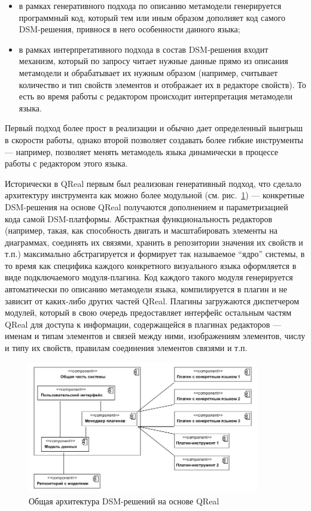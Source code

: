 \documentclass[a4]{article}
\begin{document}
\begin{itemize}
 \item в рамках генеративного подхода по описанию метамодели генерируется программный код, который тем или иным образом дополняет код самого DSM-решения, привнося в него особенности данного языка;
 \item в рамках интерпретативного подхода в состав DSM-решения входит механизм, который по запросу читает нужные данные прямо из описания метамодели и обрабатывает их нужным образом (например, считывает количество и тип свойств элементов и отображает их в редакторе свойств). То есть во время работы с редактором происходит интерпретация метамодели языка.
\end{itemize}

Первый подход более прост в реализации и обычно дает определенный выигрыш в скорости работы, однако второй позволяет создавать более гибкие инструменты --- например, позволяет менять метамодель языка динамически в процессе работы с редактором этого языка.

Исторически в QReal первым был реализован генеративный подход, что сделало архитектуру инструмента как можно более модульной (см. рис.~\ref{fig1}) --- конкретные DSM-решения на основе QReal получаются дополнением и параметризацией кода самой DSM-платформы. Абстрактная функциональность редакторов (например, такая, как способность двигать и масштабировать элементы на диаграммах, соединять их связями, хранить в репозитории значения их свойств и т.п.) максимально абстрагируется и формирует так называемое ``ядро'' системы, в то время как специфика каждого конкретного визуального языка оформляется в виде подключаемого модуля-плагина. Код каждого такого модуля генерируется автоматически по описанию метамодели языка, компилируется в плагин и не зависит от каких-либо других частей QReal. Плагины загружаются диспетчером модулей, который в свою очередь предоставляет интерфейс остальным частям QReal для доступа к информации, содержащейся в плагинах редакторов --- именам и типам элементов и связей между ними, изображениям элементов, числу и типу их свойств, правилам соединения элементов связями и т.п.

\begin{figure} [ht]
  \begin{center}
    \includegraphics[width=0.9\textwidth]{fig1-architecture-overview.png}
    \caption{Общая архитектура DSM-решений на основе QReal}
    \label{fig1}
  \end{center}
\end{figure}
\end{document}
